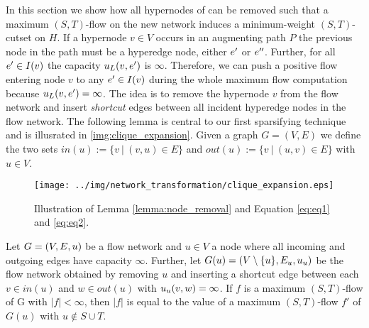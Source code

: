 In this section we show how all hypernodes of  can be removed such that a maximum 
$(S,T)$-flow on the new network induces a minimum-weight $(S,T)$-cutset on $H$. If a hypernode $v \in V$
occurs in an augmenting path $P$ the previous node in the path must be a hyperedge node, either
$e'$ or $e''$. Further, for all $e' \in I(v)$ the capacity $u_L(v,e')$ is $\infty$. 
Therefore, we can push a positive flow entering node $v$ to any $e' \in I(v)$ during the
whole maximum flow computation because $u_L(v,e') = \infty$. The idea is to remove
the hypernode $v$ from the flow network  and insert \emph{shortcut} edges between
all incident hyperedge nodes in the flow network.
The following lemma is central to our first sparsifying 
technique and is illusrated in \autoref{img:clique_expansion}. Given a graph $G = (V,E)$ we define the two sets
$in(u) := \{v\ |\ (v,u) \in E\}$ and $out(u) := \{v\ |\ (u,v) \in E\}$ with $u \in V$. 
\begin{figure}[ht!]
\centering
\texttt{[image: ../img/network\_transformation/clique\_expansion.eps]}
\caption{Illustration of Lemma \ref{lemma:node_removal} and Equation \ref{eq:eq1} and \ref{eq:eq2}.}
\label{img:clique_expansion}
\end{figure}
\begin{lemma}
\label{lemma:node_removal}
Let $G = (V,E,u)$ be a flow network and $u \in V$ a node where
all incoming and outgoing edges have capacity $\infty$.
Further, let $G(u) = (V\setminus\{u\}, E_u, u_u)$ be the flow network obtained by removing
$u$ and inserting a shortcut edge between each $v \in in(u)$ and $w \in out(u)$ with $u_u(v,w) = \infty$.
If $f$ is a maximum $(S,T)$-flow of G with $|f| < \infty$, then $|f|$ is equal to the value of a maximum
$(S,T)$-flow $f'$ of $G(u)$ with $u \notin S \cup T$.
\end{lemma}
